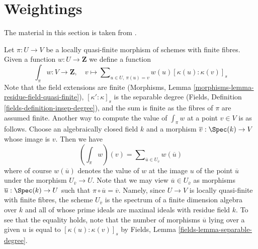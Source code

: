 \section{Weightings}
\label{section-weightings}

\noindent
The material in this section is taken from \cite[Exposee XVII, 6.2.4]{SGA4}.

\medskip\noindent
Let $\pi : U \to V$ be a locally quasi-finite morphism of schemes with
finite fibres. Given a function $w : U \to \mathbf{Z}$ we define a function
$$
\textstyle{\int}_\pi w : V \longrightarrow \mathbf{Z},\quad
v \longmapsto
\sum\nolimits_{u \in U,\ \pi(u) = v} w(u) [\kappa(u) : \kappa(v)]_s
$$
Note that the field extensions are finite
(Morphisms, Lemma \ref{morphisms-lemma-residue-field-quasi-finite}),
$[\kappa' : \kappa]_s$ is the separable degree
(Fields, Definition \ref{fields-definition-insep-degree}),
and the sum is finite as the fibres of $\pi$ are assumed finite.
Another way to compute the value of $\int_\pi w$ at a point $v \in V$
is as follows.
Choose an algebraically closed field $k$ and a morphism
$\overline{v} : \Spec(k) \to V$ whose image is $v$. Then we have
$$
(\textstyle{\int}_\pi w)(v) =
\sum\nolimits_{\overline{u} \in U_{\overline{v}}} w(\overline{u})
$$
where of course $w(\overline{u})$ denotes the value of $w$ at the
image $u$ of the point $\overline{u}$ under the morphism
$U_{\overline{v}} \to U$.
Note that we may view $\overline{u} \in U_{\overline{v}}$ as morphisms
$\overline{u} : \Spec(k) \to U$ such that
$\pi \circ \overline{u} = \overline{v}$. Namely, since
$U \to V$ is locally quasi-finite with finite fibres,
the scheme $U_{\overline{v}}$ is the spectrum
of a finite dimension algebra over $k$ and all of whose prime ideals
are maximal ideals with residue field $k$. To see that the equality
holds, note that the number of morphisms $\overline{u}$ lying over
a given $u$ is equal to $[\kappa(u) : \kappa(v)]_s$ by
Fields, Lemma \ref{fields-lemma-separable-degree}.

